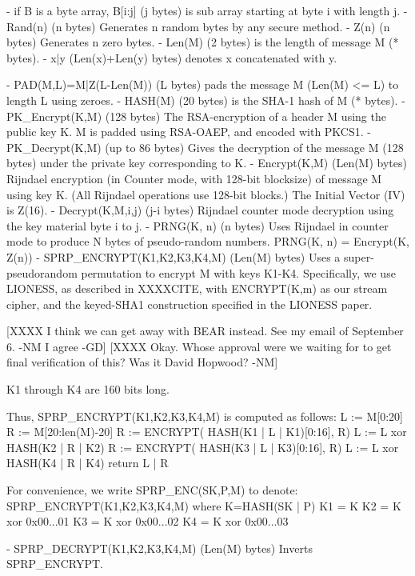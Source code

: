 - if B is a byte array, B[i:j] (j bytes) is sub array starting at 
  byte i with length j.
- Rand(n) (n bytes) Generates n random bytes by any secure method.
- Z(n) (n bytes) Generates n zero bytes.
- Len(M) (2 bytes) is the length of message M (* bytes).
- x|y (Len(x)+Len(y) bytes) denotes x concatenated with y.

- PAD(M,L)=M|Z(L-Len(M)) (L bytes) pads the message M (Len(M) <= L)
  to length L using zeroes.
- HASH(M) (20 bytes) is the SHA-1 hash of M (* bytes).
- PK_Encrypt(K,M) (128 bytes) The RSA-encryption of a header M 
  using the public key K.  M is padded using RSA-OAEP, and encoded
  with PKCS1.
- PK_Decrypt(K,M) (up to 86 bytes) Gives the decryption of the
  message M (128 bytes) under the private key corresponding to K.
- Encrypt(K,M) (Len(M) bytes) Rijndael encryption (in Counter mode,
  with 128-bit blocksize) of message M using key K.  (All Rijndael
  operations use 128-bit blocks.)  The Initial Vector (IV) is Z(16).
- Decrypt(K,M,i,j) (j-i bytes) Rijndael counter mode decryption 
  using the key material byte i to j.
- PRNG(K, n) (n bytes) Uses Rijndael in counter mode to produce N
  bytes of pseudo-random numbers.
  PRNG(K, n) = Encrypt(K, Z(n))
- SPRP_ENCRYPT(K1,K2,K3,K4,M) (Len(M) bytes) Uses a super-pseudorandom
  permutation to encrypt M with keys K1-K4.  Specifically, we use LIONESS,
  as described in XXXXCITE, with ENCRYPT(K,m) as our stream cipher,
  and the keyed-SHA1 construction specified in the LIONESS paper.

  [XXXX I think we can get away with BEAR instead.  See my email of
    September 6. -NM I agree -GD]
  [XXXX Okay.  Whose approval were we waiting for to get final
    verification of this?  Was it David Hopwood? -NM]

  K1 through K4 are 160 bits long.

  Thus, SPRP_ENCRYPT(K1,K2,K3,K4,M) is computed as follows:
            L := M[0:20]
            R := M[20:len(M)-20]
            R := ENCRYPT( HASH(K1 | L | K1)[0:16], R)
            L := L xor HASH(K2 | R | K2)
            R := ENCRYPT( HASH(K3 | L | K3)[0:16], R)
            L := L xor HASH(K4 | R | K4) 
            return L | R

  For convenience, we write SPRP_ENC(SK,P,M) to denote:
       SPRP_ENCRYPT(K1,K2,K3,K4,M)
       where K=HASH(SK | P)
             K1 = K
             K2 = K xor 0x00...01
             K3 = K xor 0x00...02
             K4 = K xor 0x00...03

- SPRP_DECRYPT(K1,K2,K3,K4,M) (Len(M) bytes) Inverts SPRP_ENCRYPT.

